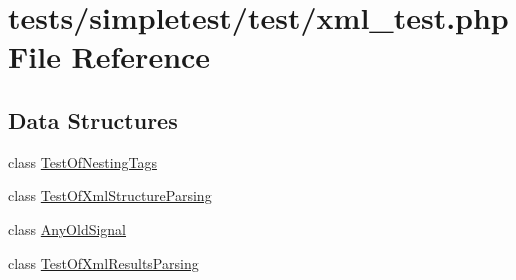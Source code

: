 \hypertarget{xml__test_8php}{\section{tests/simpletest/test/xml\-\_\-test.php File Reference}
\label{xml__test_8php}
}
\subsection*{Data Structures}
\begin{DoxyCompactItemize}
\item 
class \hyperlink{class_test_of_nesting_tags}{Test\-Of\-Nesting\-Tags}
\item 
class \hyperlink{class_test_of_xml_structure_parsing}{Test\-Of\-Xml\-Structure\-Parsing}
\item 
class \hyperlink{class_any_old_signal}{Any\-Old\-Signal}
\item 
class \hyperlink{class_test_of_xml_results_parsing}{Test\-Of\-Xml\-Results\-Parsing}
\end{DoxyCompactItemize}
